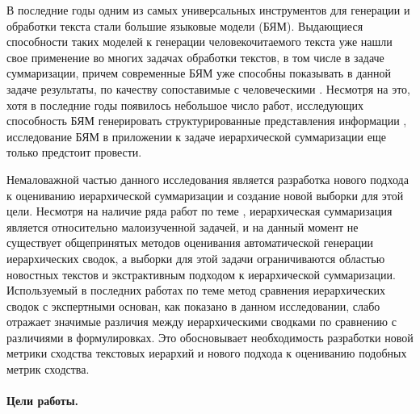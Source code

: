 \documentclass[12pt]{article}
\begin{document}
В последние годы одним из самых универсальных инструментов для генерации и обработки текста стали большие языковые модели (БЯМ). Выдающиеся способности таких моделей к генерации человекочитаемого текста уже нашли свое применение во многих задачах обработки текстов, в том числе в задаче суммаризации, причем современные БЯМ уже способны показывать в данной задаче результаты, по качеству сопоставимые с человеческими \cite{pu2023summarization}. Несмотря на это, хотя в последние годы появилось небольшое число работ, исследующих способность БЯМ генерировать структурированные представления информации \cite{jain2024structsum}, исследование БЯМ в приложении к задаче иерархической суммаризации еще только предстоит провести. 

Немаловажной частью данного исследования является разработка нового подхода к оцениванию иерархической суммаризации и создание новой выборки для этой цели. Несмотря на наличие ряда работ по теме \cite{christensen2014hierarchical, jain2024structsum, zhang2024coreference, wei2019revealing, hu2021efficient}, иерархическая суммаризация является относительно малоизученной задачей, и на данный момент не существует общепринятых методов оценивания автоматической генерации иерархических сводок, а выборки для этой задачи ограничиваются областью новостных текстов и экстрактивным подходом к иерархической суммаризации. Используемый в последних работах по теме метод сравнения иерархических сводок с экспертными основан, как показано в данном исследовании, слабо отражает значимые различия между иерархическими сводками по сравнению с различиями в формулировках. Это обосновывает необходимость разработки новой метрики сходства текстовых иерархий и нового подхода к оцениванию подобных метрик сходства. 

\paragraph{Цели работы.}
\end{document}
